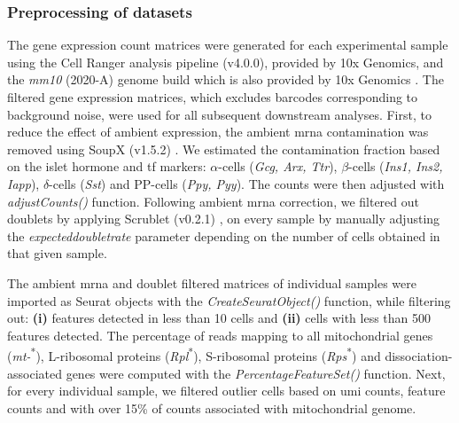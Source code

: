 \subsubsection{\large Preprocessing of datasets}
\label{subsubsec:met_chp3_preprocessing}
\par The gene expression count matrices were generated for each experimental sample using the Cell Ranger analysis pipeline (v4.0.0), provided by 10x Genomics, and the \textit{mm10} (2020-A) genome build which is also provided by 10x Genomics \textbf{\cite{noauthor_running_nodate}}. The filtered gene expression matrices, which excludes barcodes corresponding to background noise, were used for all subsequent downstream analyses. First, to reduce the effect of ambient expression, the ambient \gls{mrna} contamination was removed using SoupX (v1.5.2) \textbf{\cite{young_soupx_2020}}. We estimated the contamination fraction based on the islet hormone and \gls{tf} markers: $\alpha$-cells (\textit{Gcg, Arx, Ttr}), $\beta$-cells (\textit{Ins1, Ins2, Iapp}), $\delta$-cells (\textit{Sst}) and PP-cells (\textit{Ppy, Pyy}). The counts were then adjusted with \textit{adjustCounts()} function. Following ambient \gls{mrna} correction, we filtered out doublets by applying Scrublet (v0.2.1) \textbf{\cite{wolock_scrublet_2019}}, on every sample by manually adjusting the \textit{expected\textunderscore doublet\textunderscore rate} parameter depending on the number of cells obtained in that given sample.\\

\par The ambient \gls{mrna} and doublet filtered matrices of individual samples were imported as Seurat objects with the \textit{CreateSeuratObject()} function, while filtering out: \textbf{(i)} features detected in less than 10 cells and \textbf{(ii)} cells with less than 500 features detected. The percentage of reads mapping to all mitochondrial genes (\textit{mt-}\textsuperscript{*}), L-ribosomal proteins (\textit{Rpl}\textsuperscript{*}), S-ribosomal proteins (\textit{Rps}\textsuperscript{*}) and dissociation-associated genes were computed with the \textit{PercentageFeatureSet()} function. Next, for every individual sample, we filtered outlier cells based on \gls{umi} counts, feature counts and  with over 15\% of counts associated with mitochondrial genome.

